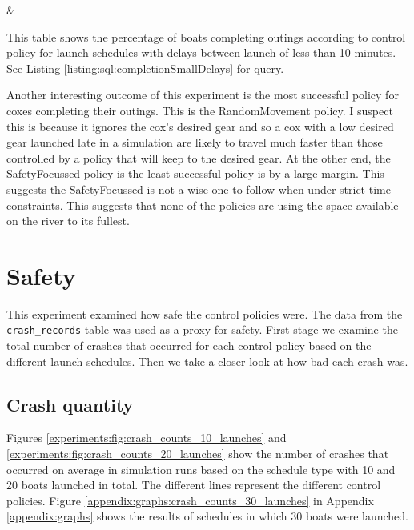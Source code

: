  \begin{table}[h]
  \centering
  {\cp & \landed}
  \caption{This table shows the percentage of boats completing outings according to control policy for launch schedules with delays between launch of less than 10 minutes. See Listing \ref{listing:sql:completionSmallDelays} for query.}
  \label{experiments:tab:returning_boats_by_policy_small_delay}
  \end{table}
  
  Another interesting outcome of this experiment is the most successful policy for coxes completing their outings. This is the RandomMovement policy. I suspect this is because it ignores the cox's desired gear and so a cox with a low desired gear launched late in a simulation are likely to travel much faster than those controlled by a policy that will keep to the desired gear. At the other end, the SafetyFocussed policy is the least successful policy is by a large margin. This suggests the SafetyFocussed is not a wise one to follow when under strict time constraints. This suggests that none of the policies are using the space available on the river to its fullest.
  
\section{Safety}
This experiment examined how safe the control policies were. The data from the \texttt{crash\_records} table was used as a proxy for safety. First stage we examine the total number of crashes that occurred for each control policy based on the different launch schedules. Then we take a closer look at how bad each crash was.
  
  \subsection{Crash quantity}
  Figures \ref{experiments:fig:crash_counts_10_launches} and \ref{experiments:fig:crash_counts_20_launches} show the number of crashes that occurred on average in simulation runs based on the schedule type with 10 and 20 boats launched in total. The different lines represent the different control policies. Figure \ref{appendix:graphs:crash_counts_30_launches} in Appendix \ref{appendix:graphs} shows the results of schedules in which 30 boats were launched.
  
